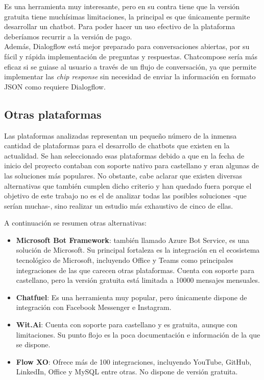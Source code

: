 Es una herramienta muy interesante, pero en su contra tiene que la versión gratuita tiene muchísimas limitaciones, la principal es que únicamente permite desarrollar un chatbot.
Para poder hacer un uso efectivo de la plataforma deberíamos recurrir a la versión de pago.\\

Además, Dialogflow está mejor preparado para conversaciones abiertas, por su fácil y rápida implementación de preguntas y respuestas. Chatcompose sería más eficaz si se guiase al usuario a través de un flujo de conversación, ya que permite implementar las \textit{chip response} sin necesidad de enviar la información en formato JSON como requiere Dialogflow. 
\newpage

\subsection{Otras plataformas}

Las plataformas analizadas representan un pequeño número de la inmensa cantidad de plataformas para el desarrollo de chatbots que existen en la actualidad. Se han seleccionado esas plataformas debido a que en la fecha de inicio del proyecto contaban con soporte nativo para castellano y eran algunas de las soluciones más populares. No obstante, cabe aclarar que existen diversas alternativas que también cumplen dicho criterio y han quedado fuera porque el objetivo de este trabajo no es el de analizar todas las posibles soluciones -que serían muchas-, sino realizar un estudio más exhaustivo de cinco de ellas. 

A continuación se resumen otras alternativas:

\begin{itemize}
	\item \textbf{Microsoft Bot Framework}: también llamado Azure Bot Service, es una solución de Microsoft. Su principal fortaleza es la integración en el ecosistema tecnológico de Microsoft, incluyendo Office y Teams como principales integraciones de las que carecen otras plataformas. Cuenta con soporte para castellano, pero la versión gratuita está limitada a 10000 mensajes mensuales. \cite{MicrosoftBotFramework}
	\item \textbf{Chatfuel}: Es una herramienta muy popular, pero únicamente dispone de integración con Facebook Messenger e Instagram. \cite{ChatFuel}
	\item \textbf{Wit.Ai}: Cuenta con soporte para castellano y es gratuita, aunque con limitaciones. Su punto flojo es la poca documentación e información de la que se dispone. \cite{Wit.Ai}
	\item \textbf{Flow XO}: Ofrece más de 100 integraciones, incluyendo YouTube, GitHub, LinkedIn, Office y MySQL entre otras. No dispone de versión gratuita. \cite{FlowXO}
	
\end{itemize}


